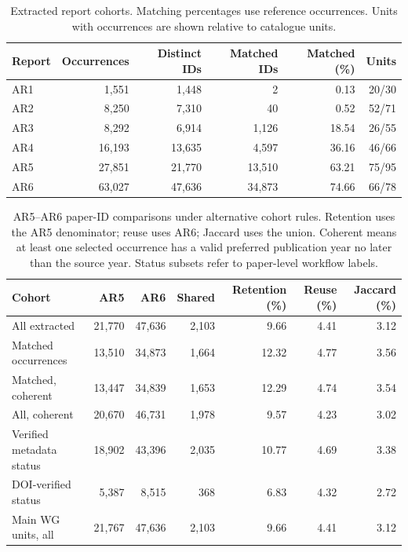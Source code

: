 \documentclass[11pt,a4paper]{article}
\begin{document}
\begin{table}[htbp]
\centering\small
\caption{Extracted report cohorts. Matching percentages use reference occurrences. Units with occurrences are shown relative to catalogue units.}
\label{tab:coverage}
\begin{tabular}{lrrrrr}
\toprule
Report & Occurrences & Distinct IDs & Matched IDs & Matched (\%) & Units\\
\midrule
AR1 & 1,551 & 1,448 & 2 & 0.13 & 20/30\\
AR2 & 8,250 & 7,310 & 40 & 0.52 & 52/71\\
AR3 & 8,292 & 6,914 & 1,126 & 18.54 & 26/55\\
AR4 & 16,193 & 13,635 & 4,597 & 36.16 & 46/66\\
AR5 & 27,851 & 21,770 & 13,510 & 63.21 & 75/95\\
AR6 & 63,027 & 47,636 & 34,873 & 74.66 & 66/78\\
\bottomrule
\end{tabular}
\end{table}

\begin{table}[htbp]
\centering\small
\caption{AR5--AR6 paper-ID comparisons under alternative cohort rules. Retention uses the AR5 denominator; reuse uses AR6; Jaccard uses the union. Coherent means at least one selected occurrence has a valid preferred publication year no later than the source year. Status subsets refer to paper-level workflow labels.}
\label{tab:transition}
\begin{tabular}{lrrrrrr}
\toprule
Cohort & AR5 & AR6 & Shared & Retention (\%) & Reuse (\%) & Jaccard (\%)\\
\midrule
All extracted & 21,770 & 47,636 & 2,103 & 9.66 & 4.41 & 3.12\\
Matched occurrences & 13,510 & 34,873 & 1,664 & 12.32 & 4.77 & 3.56\\
Matched, coherent & 13,447 & 34,839 & 1,653 & 12.29 & 4.74 & 3.54\\
All, coherent & 20,670 & 46,731 & 1,978 & 9.57 & 4.23 & 3.02\\
Verified metadata status & 18,902 & 43,396 & 2,035 & 10.77 & 4.69 & 3.38\\
DOI-verified status & 5,387 & 8,515 & 368 & 6.83 & 4.32 & 2.72\\
Main WG units, all & 21,767 & 47,636 & 2,103 & 9.66 & 4.41 & 3.12\\
\bottomrule
\end{tabular}
\end{table}
\end{document}
